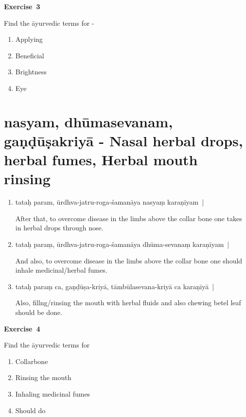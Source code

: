 \centerline{\textbf{Exercise~3}}


Find the āyurvedic terms for - 
\begin{enumerate}
\itemsep=0pt
\renewcommand{\theenumi}{\alph{enumi}}
\renewcommand{\labelenumi}{\theenumi.}
\item Applying 
\item Beneficial
\item Brightness 
\item Eye
\end{enumerate}

\chapter{nasyam, dhūmasevanam, gaṇḍūṣakriyā - Nasal herbal drops, herbal fumes, Herbal mouth rinsing}

\begin{enumerate}
\itemsep=0pt
\item {}

tataḥ param,  ūrdhva-jatru-roga-śamanāya nasyaṃ  karaṇīyam~| 

After that, to overcome disease in the limbs above the collar bone one takes in herbal drops through nose.  

\item {}

tataḥ paraṃ,  ūrdhva-jatru-roga-śamanāya  dhūma-sevanaṃ kara\-ṇīyam~|

And also, to overcome disease in the limbs above the collar bone one should inhale medicinal/herbal fumes.

\item {}

tataḥ paraṃ ca, gaṇḍūṣa-kriyā, tāmbūlasevana-kriyā ca  karaṇīyā~|

Also, fillng/rinsing the mouth with herbal fluids and also chewing betel leaf should be done.   
\end{enumerate}

\centerline{\textbf{Exercise~4}}


Find the āyurvedic terms for
\begin{enumerate}
\itemsep=0pt
\renewcommand{\theenumi}{\alph{enumi}}
\renewcommand{\labelenumi}{\theenumi.}
\item Collarbone
\item Rinsing the mouth
\item Inhaling medicinal fumes
\item Should do
\end{enumerate}


